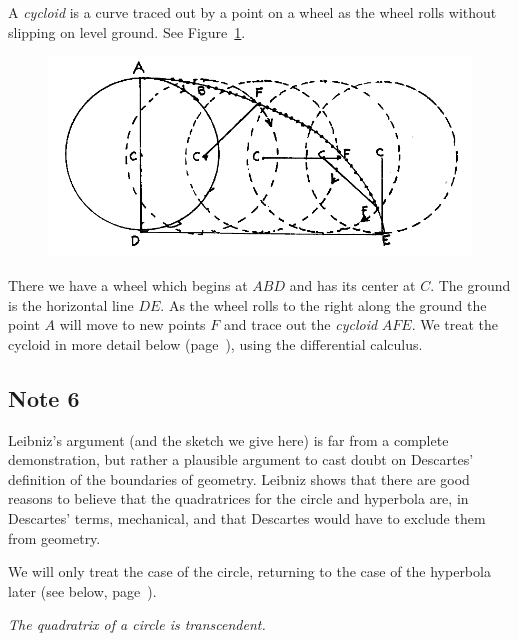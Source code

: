 \documentclass[polutonikogreek,english,twoside,openright]{article}
\begin{document}
A {\em cycloid} is a curve traced out by a point on a wheel as the
wheel rolls without slipping on level ground.  See
Figure~\ref{cycloidfig}.
\begin{figure}[htp]
\begin{center}
\includegraphics[width=\textwidth]{fig/Figure30}
\caption{}
\label{cycloidfig}
\vspace{-10pt}
\end{center}
\end{figure} There we have a wheel which begins at $ABD$ and has its
center at $C$.  The ground is the horizontal line $DE$.  As the wheel
rolls to the right along the ground the point $A$ will move to new
points $F$ and trace out the {\em cycloid} $AFE$.  We treat the
cycloid in more detail below (page~\pageref{cycloid}), using the
differential calculus.

\subsection*{Note 6}
\label{begtc}
\label{crg6}
Leibniz's argument (and the sketch we give here) is far from a
complete demonstration, but rather a plausible argument to cast doubt
on Descartes' definition of the boundaries of geometry. Leibniz shows
that there are good reasons to believe that the quadratrices for the
circle and hyperbola are, in Descartes' terms, mechanical, and that
Descartes would have to exclude them from geometry.

We will only treat the case of the circle, returning to the case of
the hyperbola later (see below, page~\pageref{begloghyp}).

\vspace{2ex}
 {\em The quadratrix of a circle is transcendent.}
\vspace{2ex}
\end{document}
